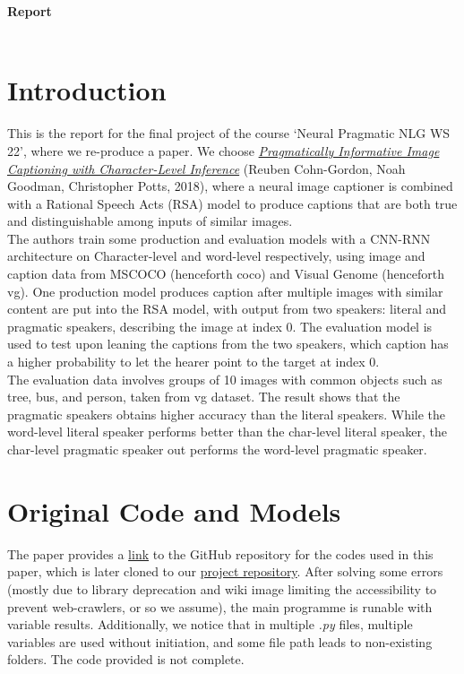 \documentclass[a4paper]{scrartcl}
\def\header#1#2{
  \begin{center}
    {\Large\bfseries Report}\\
    {\STUDENT}\\
    {\COURSE} 
  \end{center}
}
\begin{document}
\header{\NUMBER}{}

\section*{Introduction}
This is the report for the final project of the course `Neural Pragmatic NLG WS 22', where we re-produce a paper. We choose \href{https://arxiv.org/abs/1804.05417}{\emph{Pragmatically Informative Image Captioning with Character-Level Inference}} (Reuben Cohn-Gordon, Noah Goodman, Christopher Potts, 2018), where a neural image captioner is combined with a Rational Speech Acts (RSA) model to produce captions that are both true and distinguishable among inputs of similar images.\\ 

The authors train some production and evaluation models with a CNN-RNN architecture on Character-level and word-level respectively, using image and caption data from MSCOCO (henceforth coco) and Visual Genome (henceforth vg). One production model produces caption after multiple images with similar content are put into the RSA model, with output from two speakers: literal and pragmatic speakers, describing the image at index 0. The evaluation model is used to test upon leaning the captions from the two speakers, which caption has a higher probability to let the hearer point to the target at index 0.  \\

The evaluation data involves groups of 10 images with common objects such as tree, bus, and person, taken from vg dataset. The result shows that the pragmatic speakers obtains higher accuracy than the literal speakers. While the word-level literal speaker performs better than the char-level literal speaker, the char-level pragmatic speaker out performs the word-level pragmatic speaker. 

\section*{Original Code and Models}
The paper provides a \href{https://github.com/reubenharry/Recurrent-RSA}{link} to the GitHub repository for the codes used in this paper, which is later cloned to our \href{https://github.com/Meng3www/PPlusPlus}{project repository}. After solving some errors (mostly due to library deprecation and wiki image limiting the accessibility to prevent web-crawlers, or so we assume), the main programme is runable with variable results. Additionally, we notice that in multiple \emph{.py} files, multiple variables are used without initiation, and some file path leads to non-existing folders. The code provided is not complete. \\
\end{document}
